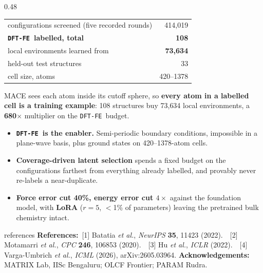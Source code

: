 \documentclass[serif,mathserif,final]{beamer}
\newcommand{\DFTFE}{\texttt{DFT-FE}}
\newcommand{\good}[1]{\textcolor{goodgreen}{\textbf{#1}}}
\newcommand{\key}[1]{\textcolor{inkblue}{\textbf{#1}}}
\begin{document}
\begin{frame}[t]
\begin{columns}[t]
\begin{column}{0.48\paperwidth}
\vspace{0.5em}

\begin{tcolorbox}[posterbox,title=Data efficiency across the campaign]
\justifying
\begin{center}\large
\begin{tabular}{lr}
\toprule
configurations screened (five recorded rounds) & 414{,}019 \\
\textbf{\DFTFE\ labelled, total}               & \key{108} \\
local environments learned from                & \good{73{,}634} \\
held-out test structures                       & 33 \\
cell size, atoms                               & 420--1378 \\
\bottomrule
\end{tabular}
\end{center}
\vspace{0.3em}
MACE sees each atom inside its cutoff sphere, so \textbf{every atom in a
labelled cell is a training example}: 108 structures buy 73{,}634 local
environments, a \good{680$\times$} multiplier on the \DFTFE\ budget.
\end{tcolorbox}

\vspace{0.5em}

\begin{tcolorbox}[posterbox,title=Conclusions,colframe=inkblue]
\justifying
\begin{itemize}
  \item \key{\DFTFE\ is the enabler.} Semi-periodic boundary conditions,
        impossible in a plane-wave basis, plus ground states on
        420--1378-atom cells.
  \item \key{Coverage-driven latent selection} spends a fixed budget on the
        configurations farthest from everything already labelled, and provably
        never re-labels a near-duplicate.
  \item \key{Force error cut 40\%, energy error cut $4\times$} against the
        foundation model, with \key{LoRA} ($r=5$, $<$1\% of parameters)
        leaving the pretrained bulk chemistry intact.
\end{itemize}
\end{tcolorbox}

\vspace{0.5em}

\begin{beamercolorbox}[wd=\linewidth,leftskip=1em]{references}
{\small\textbf{References:}\ [1] Batatia \emph{et al.}, \emph{NeurIPS}
\textbf{35}, 11423 (2022).\ \ [2] Motamarri \emph{et al.}, \emph{CPC}
\textbf{246}, 106853 (2020).\ \ [3] Hu \emph{et al.}, \emph{ICLR} (2022).\ \
[4] Varga-Umbrich \emph{et al.}, \emph{ICML} (2026), arXiv:2605.03964.
\quad\textbf{Acknowledgements:} MATRIX Lab, IISc Bengaluru; OLCF Frontier;
PARAM Rudra.}
\end{beamercolorbox}

\end{column}
\end{columns}
\end{frame}
\end{document}
